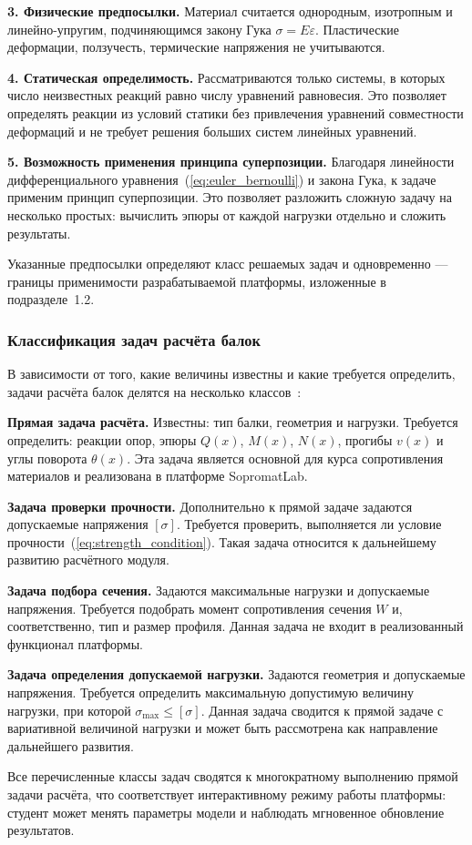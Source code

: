 \textbf{3. Физические предпосылки.} Материал считается однородным, изотропным и линейно-упругим, подчиняющимся закону Гука $\sigma = E \varepsilon$. Пластические деформации, ползучесть, термические напряжения не учитываются.

\textbf{4. Статическая определимость.} Рассматриваются только системы, в которых число неизвестных реакций равно числу уравнений равновесия. Это позволяет определять реакции из условий статики без привлечения уравнений совместности деформаций и не требует решения больших систем линейных уравнений.

\textbf{5. Возможность применения принципа суперпозиции.} Благодаря линейности дифференциального уравнения~(\ref{eq:euler_bernoulli}) и закона Гука, к задаче применим принцип суперпозиции. Это позволяет разложить сложную задачу на несколько простых: вычислить эпюры от каждой нагрузки отдельно и сложить результаты.

Указанные предпосылки определяют класс решаемых задач и одновременно --- границы применимости разрабатываемой платформы, изложенные в подразделе~1.2.

\subsubsection{Классификация задач расчёта балок}

В зависимости от того, какие величины известны и какие требуется определить, задачи расчёта балок делятся на несколько классов~\cite{feodosev, aleksandrov}:

\textbf{Прямая задача расчёта.} Известны: тип балки, геометрия и нагрузки. Требуется определить: реакции опор, эпюры $Q(x)$, $M(x)$, $N(x)$, прогибы $v(x)$ и углы поворота $\theta(x)$. Эта задача является основной для курса сопротивления материалов и реализована в платформе SopromatLab.

\textbf{Задача проверки прочности.} Дополнительно к прямой задаче задаются допускаемые напряжения $[\sigma]$. Требуется проверить, выполняется ли условие прочности~(\ref{eq:strength_condition}). Такая задача относится к дальнейшему развитию расчётного модуля.

\textbf{Задача подбора сечения.} Задаются максимальные нагрузки и допускаемые напряжения. Требуется подобрать момент сопротивления сечения $W$ и, соответственно, тип и размер профиля. Данная задача не входит в реализованный функционал платформы.

\textbf{Задача определения допускаемой нагрузки.} Задаются геометрия и допускаемые напряжения. Требуется определить максимальную допустимую величину нагрузки, при которой $\sigma_{\max} \leq [\sigma]$. Данная задача сводится к прямой задаче с вариативной величиной нагрузки и может быть рассмотрена как направление дальнейшего развития.

Все перечисленные классы задач сводятся к многократному выполнению прямой задачи расчёта, что соответствует интерактивному режиму работы платформы: студент может менять параметры модели и наблюдать мгновенное обновление результатов.
